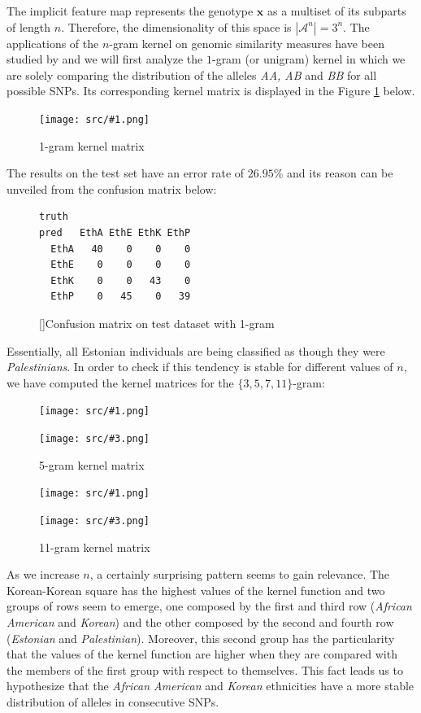 \documentclass[a4paper, 11pt]{article}
\newcommand{\Figure}[3]{
	\begin{figure}[!h]
	\centering
	\texttt{[image: src/\#1.png]}
	\caption{#3}
	\label{fig:#1}
	\end{figure}
}
\newcommand{\Figures}[4]{
	\begin{figure}[!ht]
	\begin{minipage}[b]{.5\textwidth}
	\centering
	\texttt{[image: src/\#1.png]}
	\caption{#2}
	\label{fig:#1}
	\end{minipage}
	\hfill
	\begin{minipage}[b]{.5\textwidth}
	\centering
	\texttt{[image: src/\#3.png]}
	\caption{#4}
	\label{fig:#3}
	\end{minipage}
	\end{figure}
}
\theoremstyle{definition}
\theoremstyle{remark}
\begin{document}
The implicit feature map represents the genotype $\mathbf{x}$ as a multiset of its subparts of length $n$. Therefore, the dimensionality of this space is $| \mathcal{A}^n| = 3^n$. The applications of the $n$-gram kernel on genomic similarity measures have been studied by \cite{GenonicSimilarity} and we will first analyze the $1$-gram (or unigram) kernel in which we are solely comparing the distribution of the alleles \textit{AA, AB} and \textit{BB} for all possible SNPs. Its corresponding kernel matrix is displayed in the Figure \ref{fig:1_gram_kernel} below.

\Figure{1_gram_kernel}{8.2}{1-gram kernel matrix}


\newpage

The results on the test set have an error rate of $26.95\%$ and its reason can be unveiled from the confusion matrix below:

\begin{figure}[!h]
\centering
\begin{BVerbatim}[baselinestretch=1]
      truth
pred   EthA EthE EthK EthP
  EthA   40    0    0    0
  EthE    0    0    0    0
  EthK    0    0   43    0
  EthP    0   45    0   39
\end{BVerbatim}    
[]{Confusion matrix on test dataset with 1-gram}
\end{figure}

Essentially, all Estonian individuals are being classified as though they were \textit{Palestinians}. In order to check if this tendency is stable for different values of $n$, we have computed the kernel matrices for the $\{3, 5, 7, 11\}$-gram: 

\Figures{3_gram_kernel}{3-gram kernel matrix}{5_gram_kernel}{5-gram kernel matrix}

\Figures{7_gram_kernel}{7-gram kernel matrix}{11_gram_kernel}{11-gram kernel matrix}


As we increase $n$, a certainly surprising pattern seems to gain relevance. The Korean-Korean square has the highest values of the kernel function and two groups of rows seem to emerge, one composed by the first and third row (\textit{African American} and \textit{Korean}) and the other composed by the second and fourth row (\textit{Estonian} and \textit{Palestinian}). Moreover, this second group has the particularity that the values of the kernel function are higher when they are compared with the members of the first group with respect to themselves. This fact leads us to hypothesize that the \textit{African American} and \textit{Korean} ethnicities have a more stable distribution of alleles in consecutive SNPs.\\
\end{document}
